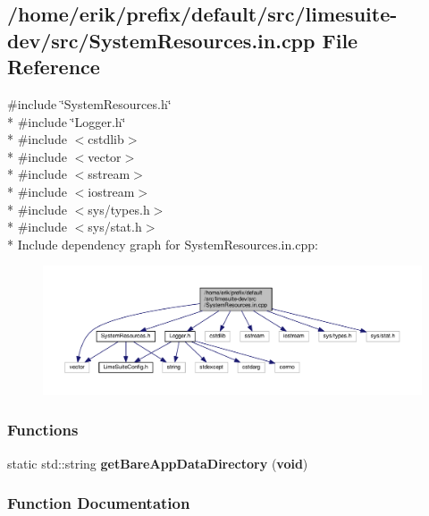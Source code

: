 \subsection{/home/erik/prefix/default/src/limesuite-\/dev/src/\+System\+Resources.in.\+cpp File Reference}
\label{SystemResources_8in_8cpp}
{\ttfamily \#include \char`\"{}System\+Resources.\+h\char`\"{}}\\*
{\ttfamily \#include \char`\"{}Logger.\+h\char`\"{}}\\*
{\ttfamily \#include $<$cstdlib$>$}\\*
{\ttfamily \#include $<$vector$>$}\\*
{\ttfamily \#include $<$sstream$>$}\\*
{\ttfamily \#include $<$iostream$>$}\\*
{\ttfamily \#include $<$sys/types.\+h$>$}\\*
{\ttfamily \#include $<$sys/stat.\+h$>$}\\*
Include dependency graph for System\+Resources.\+in.\+cpp\+:
\nopagebreak
\begin{figure}[H]
\begin{center}
\leavevmode
\includegraphics[width=350pt]{da/d0f/SystemResources_8in_8cpp__incl}
\end{center}
\end{figure}
\subsubsection*{Functions}
\begin{DoxyCompactItemize}
\item 
static std\+::string {\bf get\+Bare\+App\+Data\+Directory} ({\bf void})
\end{DoxyCompactItemize}


\subsubsection{Function Documentation}
